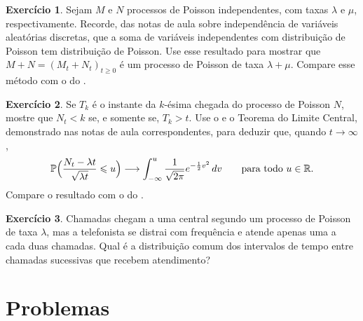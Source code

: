 \documentclass[12pt,portuguese]{article}
\theoremstyle{definition}
\theoremstyle{plainexercise}
\newtheorem{exercise}{Exercício}
\theoremstyle{starredexercise}
\theoremstyle{definition}
\begin{document}
\begin{exercise}\label{exercise:soma-poisson-processos}
Sejam $M$ e $N$ processos de Poisson independentes, com taxas $\lambda$ e
$\mu$, respectivamente. Recorde, das notas de aula sobre independência de
variáveis aleatórias discretas, que a soma de variáveis independentes com
distribuição de Poisson tem distribuição de Poisson. Use esse resultado para
mostrar que $M+N=(M_t+N_t)_{t\geqslant0}$ é um processo de Poisson de taxa
$\lambda+\mu$. Compare esse método com o do .
\end{exercise}

\begin{exercise}\label{exercise:clt-via-tempos-chegada}
Se $T_k$ é o instante da $k$-ésima chegada do processo de Poisson $N$, mostre
que $N_t<k$ se, e somente se, $T_k>t$. Use o  e o
Teorema do Limite Central, demonstrado nas notas de aula correspondentes, para
deduzir que, quando $t\to\infty$,
\[
  \mathbb{P}\Bigl(\frac{N_t-\lambda t}{\sqrt{\lambda t}}\leqslant u\Bigr)
  \longrightarrow
  \int_{-\infty}^{u}\frac{1}{\sqrt{2\pi}}e^{-\frac{1}{2}v^2}\,dv
  \qquad\text{para todo } u\in\mathbb{R}.
\]
Compare o resultado com o do .
\end{exercise}

\begin{exercise}\label{exercise:chamadas-alternadas}
Chamadas chegam a uma central segundo um processo de Poisson de taxa
$\lambda$, mas a telefonista se distrai com frequência e atende apenas uma a
cada duas chamadas. Qual é a distribuição comum dos intervalos de tempo entre
chamadas sucessivas que recebem atendimento?
\end{exercise}

\section{Problemas}\label{sec:problemas}

\providecommand{\starredproblem}{%
\stepcounter{enumi}\llap{\textasteriskcentered\,}\arabic{enumi}.}
\end{document}
